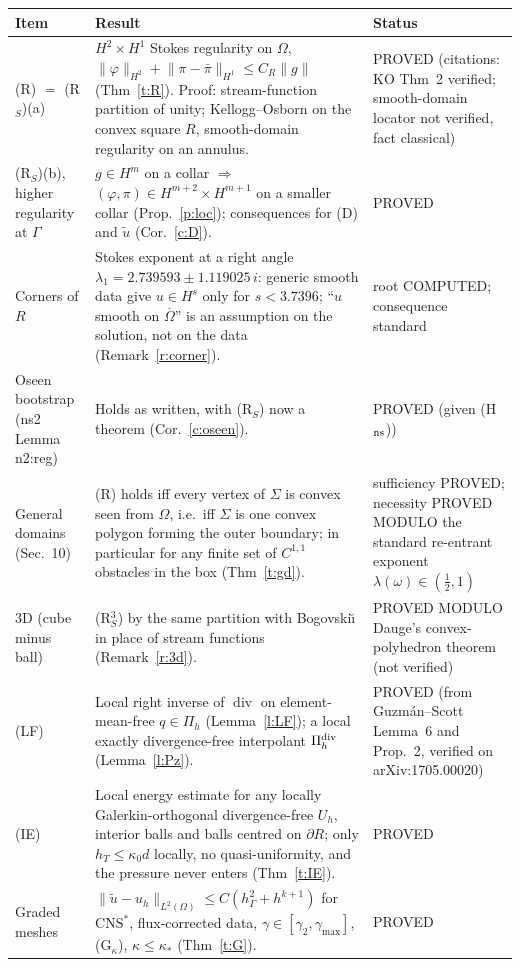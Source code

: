 \documentclass[11pt,reqno]{amsart}
\theoremstyle{plain}
\theoremstyle{definition}
\newcommand{\hG}{h_\Gamma}
\newcommand{\Pih}{\Pi_h}
\newcommand{\ut}{\tilde u}
\newcommand{\norm}[1]{\lVert #1\rVert}
\newcommand{\CNS}{\mathrm{CNS}^\ast}
\renewcommand{\div}{\operatorname{div}}
\newcommand{\Pz}{\Pi^{\rm div}_h}   %
\begin{document}
\begin{center}\footnotesize
\begin{tabular}{>{\raggedright\arraybackslash}p{}>{\raggedright\arraybackslash}p{}>{\raggedright\arraybackslash}p{}}
\toprule
Item & Result & Status\\
\midrule
(R) $=$ (R$_S$)(a) & $H^2\times H^1$ Stokes regularity on $\Omega$, $\norm\varphi_{H^2}+\norm{\pi-\bar\pi}_{H^1}\le C_R\norm g$ (Thm~\ref{t:R}). Proof: stream-function partition of unity; Kellogg--Osborn on the convex square $R$, smooth-domain regularity on an annulus. & PROVED (citations: KO Thm~2 verified; smooth-domain locator not verified, fact classical)\\
(R$_S$)(b), higher regularity at $\Gamma$ & $g\in H^m$ on a collar $\Rightarrow$ $(\varphi,\pi)\in H^{m+2}\times H^{m+1}$ on a smaller collar (Prop.~\ref{p:loc}); consequences for (D) and $\ut$ (Cor.~\ref{c:D}). & PROVED\\
Corners of $R$ & Stokes exponent at a right angle $\lambda_1=2.739593\pm1.119025\,i$: generic smooth data give $u\in H^{s}$ only for $s<3.7396$; ``$u$ smooth on $\overline\Omega$'' is an assumption on the solution, not on the data (Remark~\ref{r:corner}). & root COMPUTED; consequence standard\\
Oseen bootstrap (ns2 Lemma n2:reg) & Holds as written, with (R$_S$) now a theorem (Cor.~\ref{c:oseen}). & PROVED (given (H$_{\rm ns}$))\\
General domains (Sec.~10) & (R) holds iff every vertex of $\Sigma$ is convex seen from $\Omega$, i.e.\ iff $\Sigma$ is one convex polygon forming the outer boundary; in particular for any finite set of $C^{1,1}$ obstacles in the box (Thm~\ref{t:gd}). & sufficiency PROVED; necessity PROVED MODULO the standard re-entrant exponent $\lambda(\omega)\in(\frac12,1)$\\
3D (cube minus ball) & (R$_S^3$) by the same partition with Bogovski\u\i{} in place of stream functions (Remark~\ref{r:3d}). & PROVED MODULO Dauge's convex-polyhedron theorem (not verified)\\
(LF) & Local right inverse of $\div$ on element-mean-free $q\in\Pih$ (Lemma~\ref{l:LF}); a local exactly divergence-free interpolant $\Pz$ (Lemma~\ref{l:Pz}). & PROVED (from Guzm\'an--Scott Lemma~6 and Prop.~2, verified on arXiv:1705.00020)\\
(IE) & Local energy estimate for any locally Galerkin-orthogonal divergence-free $U_h$, interior balls and balls centred on $\partial R$; only $h_T\le\kappa_0d$ locally, no quasi-uniformity, and the pressure never enters (Thm~\ref{t:IE}). & PROVED\\
Graded meshes & $\norm{\ut-u_h}_{L^2(\Omega)}\le C(\hG^2+h^{k+1})$ for $\CNS$, flux-corrected data, $\gamma\in[\gamma_2,\gamma_{\max}]$, (G$_\kappa$), $\kappa\le\kappa_\ast$ (Thm~\ref{t:G}). & PROVED\\
\bottomrule
\end{tabular}
\end{center}
\end{document}
